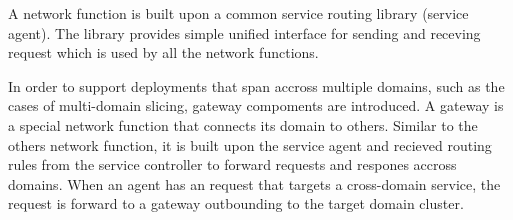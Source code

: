 \documentclass[a4paper]{article}
\begin{document}
A network function is built upon a common service routing library (service agent). The library provides simple unified interface for sending and receving request which is used by all the network functions. 

In order to support deployments that span accross multiple domains, such as the cases of multi-domain slicing, gateway compoments are introduced. A gateway is a special network function that connects its domain to others. Similar to the others network function, it is built upon the service agent and recieved routing rules from the service controller to forward requests and respones accross domains. When an agent has an request that targets a cross-domain service, the request is forward to a gateway outbounding to the target domain cluster.

\end{document}

